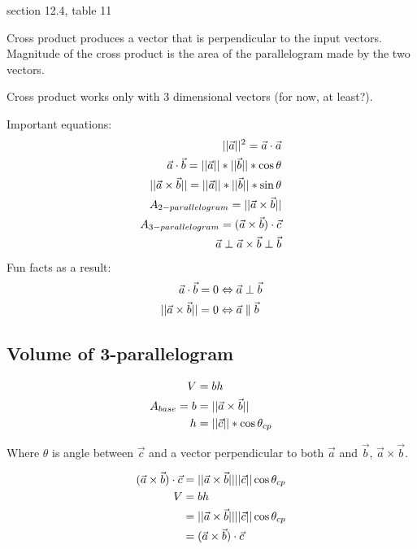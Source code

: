 \documentclass{article}
\DeclarePairedDelimiter\magn{\lvert\lvert}{\rvert\rvert}
\begin{document}
section 12.4, table 11

Cross product produces a vector that is perpendicular to the input vectors.  Magnitude of the cross product is the area of the parallelogram made by the two vectors.

\begin{stonk}
  Cross product works only with 3 dimensional vectors (for now, at least?).
  
  Important equations:
  \begin{align*}
    \magn{\vec a}^2=\vec a\cdot\vec a\\
    \vec{a}\cdot\vec{b}=\magn{\vec{a}}*\magn{\vec{b}}*\cos\theta\\
    \magn{\vec{a}\times\vec{b}}=\magn{\vec{a}}*\magn{\vec{b}}*\sin\theta\\
    A_{2-parallelogram}=\magn{\vec a\times\vec b}\\
    A_{3-parallelogram}=(\vec a\times\vec b)\cdot\vec c\\
    \vec a\perp\vec a\times\vec b\perp\vec b
  \end{align*}
  Fun facts as a result:
  \begin{align*}
    \vec{a}\cdot\vec{b}=0&\Leftrightarrow\vec a\perp\vec b\\
    \magn{\vec{a}\times\vec{b}}=0&\Leftrightarrow\vec a\parallel\vec b\\
  \end{align*}
\end{stonk}


\subsection*{Volume of 3-parallelogram}

\begin{align*}
  V&=bh\\
  A_{base}=b&=\magn{\vec a\times\vec b}\\
  h&=\magn{\vec{c}}*\cos\theta_{cp}
\end{align*}

Where $\theta$ is angle between $\vec{c}$ and a vector perpendicular to both $\vec a$ and $\vec b$, $\vec a\times\vec b$.

\begin{align*}
  (\vec a\times\vec b)\cdot\vec c&=\magn{\vec a\times\vec b}\magn{\vec c}\cos\theta_{cp}\\
  V&=bh\\
  &=\magn{\vec a\times\vec b}\magn{\vec{c}}\cos\theta_{cp}\\
  &=(\vec a\times\vec b)\cdot\vec c\\
\end{align*}
\end{document}

